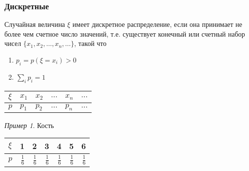 \documentclass[english]{article}
\theoremstyle{plain}
\theoremstyle{remark}
\newtheorem*{examp}{Пример}
\theoremstyle{definition}
\begin{document}
\subsubsection{Дискретные}
\label{sec:orge969965}
Случайная величина \(\xi\) имеет дискретное распределение, если она принимает не более чем счетное число значений, т.е. существует конечный или счетный набор чисел \(\{x_1, x_2, \dots, x_n, \dots\}\), такой что
\begin{enumerate}
\item \(p_i = p(\xi = x_i) > 0\)
\item \(\sum\limits_i p_i = 1\)
\end{enumerate}
\begin{center}
\begin{tabular}{l|lllll}
\(\xi\) & \(x_1\) & \(x_2\) & \(\dots\) & \(x_n\) & \(\dots\)\\
\hline
\(p\) & \(p_1\) & \(p_2\) & \(\dots\) & \(p_n\) & \(\dots\)\\
\end{tabular}
\end{center}
\todo
\begin{examp}
Кость
\begin{center}
\begin{tabular}{l|rrrrrr}
\(\xi\) & 1 & 2 & 3 & 4 & 5 & 6\\
\hline
\(p\) & \(\frac{1}{6}\) & \(\frac{1}{6}\) & \(\frac{1}{6}\) & \(\frac{1}{6}\) & \(\frac{1}{6}\) & \(\frac{1}{6}\)\\
\end{tabular}
\end{center}
\todo
\label{org3db6661}
\end{examp}
\end{document}
